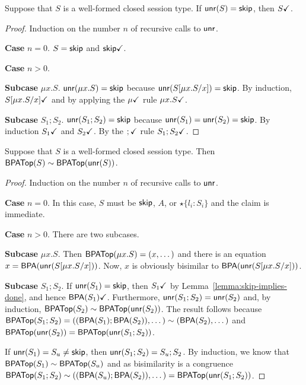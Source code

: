 \begin{lemma}\label{lemma:skip-implies-done}
  Suppose that $S$ is a well-formed closed session type.
  If $\mathsf{unr} (S) = \mathsf{skip}$, then $S \checkmark$.
\end{lemma}
\begin{proof}
  Induction on the number $n$ of recursive calls to $\mathsf{unr}$.

  \textbf{Case }$n=0$. $S=\mathsf{skip}$ and $\mathsf{skip} \checkmark$.

  \textbf{Case }$n>0$.

  \textbf{Subcase }$\mu x.S$. $\mathsf{unr} (\mu x.S) = \mathsf{skip}$ because
  $\mathsf{unr} (S[\mu x.S/x]) = \mathsf{skip}$. By induction,
  $S[\mu x.S/x] \checkmark$ and by applying the $\mu \checkmark$ rule
  $\mu x.S \checkmark$.

  \textbf{Subcase }$S_1;S_2$.  $\mathsf{unr} (S_1;S_2) = \mathsf{skip}$ because
  $\mathsf{unr} (S_1) = \mathsf{unr} (S_2) = \mathsf{skip}$. By induction
  $S_1 \checkmark$ and $S_2 \checkmark$. By the $; \checkmark$ rule
  $S_1;S_2 \checkmark$.
\end{proof}

\begin{lemma}\label{lemma:s=unr-s}
  Suppose that $S$ is a well-formed closed session type.  Then
  $\mathsf{BPATop} (S) \sim \mathsf{BPATop} (\mathsf{unr} (S))$.
\end{lemma}
\begin{proof}
  Induction on the number $n$ of recursive calls to $\mathsf{unr}$.

  \textbf{Case} $n=0$. In this case, $S$ must be $\mathsf{skip}$, $A$, or
  $\star\{l_i:S_i\}$ and the claim is immediate.

  \textbf{Case} $n>0$. There are two subcases.

  \textbf{Subcase} $\mu x.S$. Then $\mathsf{BPATop} (\mu x.S) = (x, \dots)$
  and there is an equation $x = \mathsf{BPA} (\mathsf{unr}(S[{\mu
      x.S}/{x}]))$.
  Now, $x$ is obviously bisimilar to
  $\mathsf{BPA} (\mathsf{unr}(S[{\mu x.S}/{x}]))$.

  \textbf{Subcase }$S_1;S_2$. If $\mathsf{unr} (S_1) = \mathsf{skip}$, then
  $S_1 \checkmark$ by Lemma~\ref{lemma:skip-implies-done}, and hence
  $\mathsf{BPA} (S_1) \checkmark$. Furthermore,
  $\mathsf{unr} (S_1;S_2) = \mathsf{unr} (S_2)$ and, by induction,
  $\mathsf{BPATop} (S_2) \sim \mathsf{BPATop} (\mathsf{unr}(S_2))$. The result
  follows because
  $\mathsf{BPATop} (S_1;S_2) = ((\mathsf{BPA} (S_1);\mathsf{BPA} (S_2)), \dots) \sim
  (\mathsf{BPA} (S_2), \dots)$
  and $\mathsf{BPATop} (\mathsf{unr}(S_2)) = \mathsf{BPATop} (\mathsf{unr} (S_1;S_2))$.

  \begin{sloppypar}
    If $\mathsf{unr} (S_1) = S_u \ne \mathsf{skip}$, then
    $\mathsf{unr} (S_1;S_2) = S_u; S_2$.  By induction, we know that
    $\mathsf{BPATop} (S_1) \sim \mathsf{BPATop} (S_u)$ and as bisimilarity is
    a congruence
    $\mathsf{BPATop} (S_1;S_2) \sim ((\mathsf{BPA} (S_u); \mathsf{BPA} (S_2)), \dots)
    = \mathsf{BPATop} (\mathsf{unr} (S_1;S_2))$.
  \end{sloppypar}
\end{proof}

